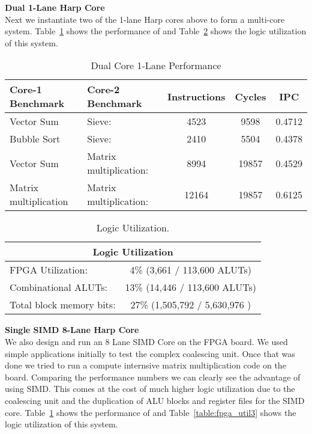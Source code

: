 \textbf{Dual 1-Lane Harp Core}\\
Next we instantiate two of the 1-lane Harp cores above to form a multi-core system. Table~\ref{table:perf2} shows the performance of and Table~\ref{table:fpga_util2} shows the logic utilization of this system.

\begin{table}[!htbp]
  \centering
  \begin{tabular}{|l|l|c|c|c|}
    \hline
Core-1 Benchmark	&Core-2 Benchmark	&Instructions 	&Cycles		&IPC	\\
    \hline
Vector Sum   	&Sieve: 			&4523		&9598		&0.4712	\\
Bubble Sort   	&Sieve:     			&2410		&5504		&0.4378	\\
Vector Sum	&Matrix multiplication:		&8994		&19857		&0.4529	\\
Matrix multiplication&Matrix multiplication:	&12164		&19857		&0.6125 \\
    \hline
  \end{tabular}
  \caption{Dual Core 1-Lane Performance}
  \label{table:perf2}
\end{table}

\begin{table}[!htbp]
  \centering
  \begin{tabular}{|l|c|}
    \hline
    \multicolumn{2}{|c|}{Logic Utilization} \\
    \hline
FPGA Utilization:				&4\%  (3,661 / 113,600 ALUTs)\\
Combinational ALUTs:			&13\%       (14,446 / 113,600 ALUTs)\\
Total block memory bits:	&27\%   (1,505,792 / 5,630,976 )\\
    \hline
  \end{tabular}
  \caption{Logic Utilization.}
  \label{table:fpga_util2}
\end{table}

\textbf{Single SIMD 8-Lane Harp Core}\\
We also design and run an 8 Lane SIMD Core on the FPGA board. We used simple applications initially to test the complex coalescing unit. Once that was done we tried to run a compute internsive matrix multiplication code on the board. Comparing the performance numbers we can clearly see the advantage of using SIMD. This comes at the cost of much higher logic utilization due to the coalescing unit and the duplication of ALU blocks and register files for the SIMD core. Table~\ref{table:perf2} shows the performance of and Table~\ref{table:fpga_util3} shows the logic utilization of this system.

